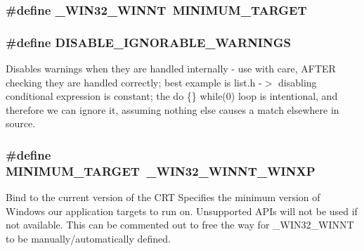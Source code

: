 \subsubsection[{\-\_\-\-W\-I\-N32\-\_\-\-W\-I\-N\-N\-T}]{\setlength{\rightskip}{0pt plus 5cm}\#define \-\_\-\-W\-I\-N32\-\_\-\-W\-I\-N\-N\-T~{\bf M\-I\-N\-I\-M\-U\-M\-\_\-\-T\-A\-R\-G\-E\-T}}\label{build_8h_ac50762666aa00bd3a4308158510f1748}
\subsubsection[{D\-I\-S\-A\-B\-L\-E\-\_\-\-I\-G\-N\-O\-R\-A\-B\-L\-E\-\_\-\-W\-A\-R\-N\-I\-N\-G\-S}]{\setlength{\rightskip}{0pt plus 5cm}\#define D\-I\-S\-A\-B\-L\-E\-\_\-\-I\-G\-N\-O\-R\-A\-B\-L\-E\-\_\-\-W\-A\-R\-N\-I\-N\-G\-S}\label{build_8h_ad2c5126c96c0ab7848935db389dca345}
Disables warnings when they are handled internally -\/ use with care, A\-F\-T\-E\-R checking they are handled correctly; best example is list.\-h -\/$>$ disabling conditional expression is constant; the do \{\} while(0) loop is intentional, and therefore we can ignore it, assuming nothing else causes a match elsewhere in source. 
\subsubsection[{M\-I\-N\-I\-M\-U\-M\-\_\-\-T\-A\-R\-G\-E\-T}]{\setlength{\rightskip}{0pt plus 5cm}\#define M\-I\-N\-I\-M\-U\-M\-\_\-\-T\-A\-R\-G\-E\-T~\-\_\-\-W\-I\-N32\-\_\-\-W\-I\-N\-N\-T\-\_\-\-W\-I\-N\-X\-P}\label{build_8h_a65cd3615ddc670f8e929a0d6a2976ea4}
Bind to the current version of the C\-R\-T Specifies the minimum version of Windows our application targets to run on. Unsupported A\-P\-Is will not be used if not available. This can be commented out to free the way for \-\_\-\-W\-I\-N32\-\_\-\-W\-I\-N\-N\-T to be manually/automatically defined. 
